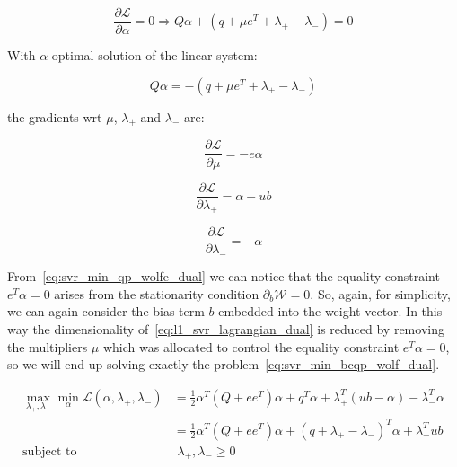 \begin{equation} \label{eq:svr_lagrangian_der_a}
	\frac{\partial \mathcal{L}}{\partial \alpha}=0\Rightarrow Q \alpha + (q + \mu e^T + \lambda_+ - \lambda_-) = 0
\end{equation}

With $\alpha$ optimal solution of the linear system:

\begin{equation} \label{eq:l1_svr_lagrangian_sol}
    Q \alpha = - (q + \mu e^T + \lambda_+ - \lambda_-)
\end{equation}

the gradients wrt $\mu$, $\lambda_+$ and $\lambda_-$ are:

\begin{equation} \label{eq:svr_lagrangian_der_mu}
	\frac{\partial \mathcal{L}}{\partial \mu}=-e \alpha
\end{equation}

\begin{equation} \label{eq:svr_lagrangian_der_lp}
	\frac{\partial \mathcal{L}}{\partial \lambda_+}=\alpha - ub
\end{equation}

\begin{equation} \label{eq:svr_lagrangian_der_lm}
    \frac{\partial \mathcal{L}}{\partial \lambda_-}=-\alpha
\end{equation}

From~\eqref{eq:svr_min_qp_wolfe_dual} we can notice that the equality constraint $e^T \alpha = 0$ arises from the stationarity condition $\partial_{{b}} \mathcal{W}=0$. So, again, for simplicity, we can again consider the bias term $b$ embedded into the weight vector. In this way the dimensionality of~\eqref{eq:l1_svr_lagrangian_dual} is reduced by removing the multipliers $\mu$ which was allocated to control the equality constraint $e^T \alpha=0$, so we will end up solving exactly the problem~\eqref{eq:svr_min_bcqp_wolf_dual}.

\begin{equation} \label{eq:l1_svr_bcqp_lagrangian_dual}
	\begin{aligned}
    	\max_{\lambda_+,\lambda_-} \min_{\alpha} \mathcal{L}(\alpha,\lambda_+,\lambda_-) &= \frac{1}{2} \alpha^T (Q + ee^T)\alpha+q^T\alpha + \lambda_+^T (ub - \alpha) - \lambda_-^T \alpha \\
    &= \frac{1}{2} \alpha^T (Q + ee^T)\alpha + (q + \lambda_+ - \lambda_-)^T \alpha + \lambda_+^T ub \\
    \text{subject to} \quad & \,\, \lambda_+, \lambda_- \geq 0
	\end{aligned}
\end{equation}

